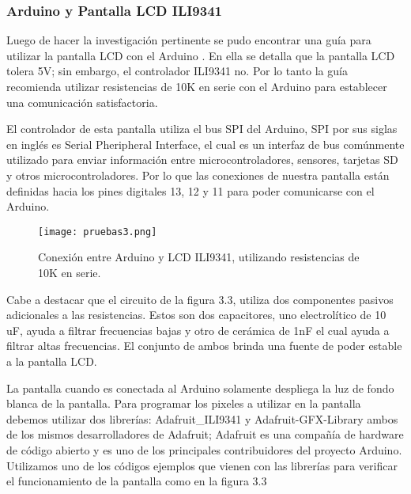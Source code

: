 \subsubsection{Arduino y Pantalla LCD ILI9341}

\par 
Luego de hacer la investigación pertinente se pudo encontrar una guía para utilizar la pantalla LCD con el Arduino \cite{edu8tv}. En ella se detalla que la pantalla LCD tolera 5V; sin embargo, el controlador ILI9341 no. Por lo tanto la guía recomienda utilizar resistencias de 10K en serie con el Arduino para establecer una comunicación satisfactoria.

\par \noindent
El controlador de esta pantalla utiliza el bus SPI del Arduino, SPI por sus siglas en inglés es Serial Pheripheral Interface, el cual es un interfaz de bus comúnmente utilizado para enviar información entre microcontroladores, sensores, tarjetas SD y otros microcontroladores. Por lo que las conexiones de nuestra pantalla están definidas hacia los pines digitales 13, 12 y 11 para poder comunicarse con el Arduino.

\begin{figure}[H]
	\centering
	\texttt{[image: pruebas3.png]}
	\caption{Conexión entre Arduino y LCD ILI9341, utilizando resistencias de 10K en serie.}
\end{figure}

\clearpage

\par \noindent
Cabe a destacar que el circuito de la figura 3.3, utiliza dos componentes pasivos adicionales a las resistencias. Estos son dos capacitores, uno electrolítico de 10 uF, ayuda a filtrar frecuencias bajas y otro de cerámica de 1nF el cual ayuda a filtrar altas frecuencias. El conjunto de ambos brinda una fuente de poder estable a la pantalla LCD.

\par \noindent
La pantalla cuando es conectada al Arduino solamente despliega la luz de fondo blanca de la pantalla. Para programar los pixeles a utilizar en la pantalla debemos utilizar dos librerías: Adafruit\_ILI9341\cite{adafruit-lcd} y Adafruit-GFX-Library\cite{adafruit-gfx} ambos de los mismos desarrolladores de Adafruit; Adafruit es una compañía de hardware de código abierto y es uno de los principales contribuidores del proyecto Arduino. Utilizamos uno de los códigos ejemplos que vienen con las librerías para verificar el funcionamiento de la pantalla como en la figura 3.3

